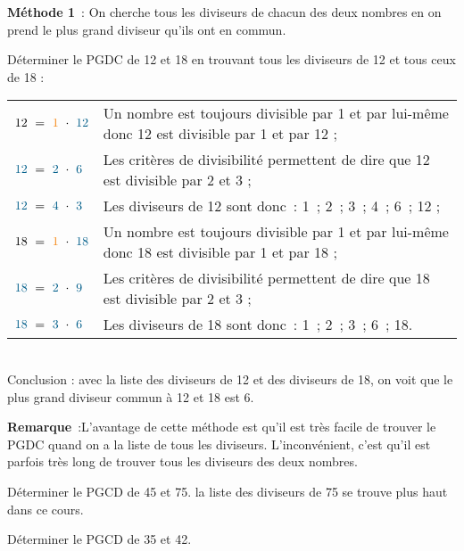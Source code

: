  \begin{methode*1}

\textcolor{H1}{\textbf{Méthode 1}} : On cherche tous les diviseurs de chacun des deux nombres en on prend le plus grand diviseur qu'ils ont en commun.

\begin{exemple*1}
Déterminer le PGDC de 12 et 18 en trouvant tous les diviseurs de 12 et tous ceux de 18 : \\[1em]
\begin{tabularx}{\textwidth}{l|X}
 $12 = \textcolor{J1}{1} \cdot \textcolor{A1}{12}$ & Un nombre est toujours divisible par 1 et par lui-même donc 12 est divisible par 1 et par 12 ; \\ 
 $\textcolor{A1}{12 }= \textcolor{A1}{2} \cdot \textcolor{A1}{6}$ & Les critères de divisibilité permettent de dire que 12 est divisible par 2 et 3 ; \\
 $\textcolor{A1}{12} = \textcolor{A1}{4} \cdot \textcolor{A1}{3}$ & Les diviseurs de 12 sont donc : 1 ; 2 ; 3 ; 4 ; 6 ; 12 ; \\
 $18 = \textcolor{J1}{1} \cdot \textcolor{A1}{18}$ & Un nombre est toujours divisible par 1 et par lui-même donc 18 est divisible par 1 et par 18 ; \\ 
 $\textcolor{A1}{18} = \textcolor{A1}{2} \cdot \textcolor{A1}{9}$ & Les critères de divisibilité permettent de dire que 18 est divisible par 2 et 3 ; \\
 $\textcolor{A1}{18} = \textcolor{A1}{3} \cdot \textcolor{A1}{6}$ & Les diviseurs de 18 sont donc : 1 ; 2 ; 3 ; 6 ; 18. \\
\end{tabularx} \\[1em]
Conclusion : avec la liste des diviseurs de 12 et des diviseurs de 18, on voit que le plus grand diviseur commun à 12 et 18 est 6. \\[-2em]
 \end{exemple*1}
 
\vspace{1em}

\textcolor{H1}{\textbf{Remarque}} :L'avantage de cette méthode est qu'il est très facile de trouver le PGDC quand on a la liste de tous les diviseurs. L'inconvénient, c'est qu'il est parfois très long de trouver tous les diviseurs des deux nombres.


 \exercice  
Déterminer le PGCD de 45 et 75. la liste des diviseurs de 75 se trouve plus haut dans ce cours.

\vspace{2em}


\exercice  
Déterminer le PGCD de 35 et 42.





 \end{methode*1}




